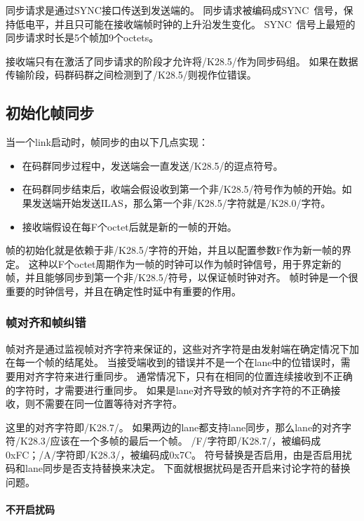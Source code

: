 \documentclass[UTF8]{ctexart}
\begin{document}
同步请求是通过SYNC接口传送到发送端的。
同步请求被编码成SYNC~信号，保持低电平，并且只可能在接收端帧时钟的上升沿发生变化。
SYNC~信号上最短的同步请求时长是5个帧加9个octets。

接收端只有在激活了同步请求的阶段才允许将/K28.5/作为同步码组。
如果在数据传输阶段，码群码群之间检测到了/K28.5/则视作位错误。

\subsection{初始化帧同步}

当一个link启动时，帧同步的由以下几点实现：

\begin{itemize}
  \item 在码群同步过程中，发送端会一直发送/K28.5/的逗点符号。
  \item 在码群同步结束后，收端会假设收到第一个非/K28.5/符号作为帧的开始。如果发送端开始发送ILAS，那么第一个非/K28.5/字符就是/K28.0/字符。
  \item 接收端假设在每F个octet后就是新的一帧的开始。
\end{itemize}

帧的初始化就是依赖于非/K28.5/字符的开始，并且以配置参数F作为新一帧的界定。
这种以F个octet周期作为一帧的时钟可以作为帧时钟信号，用于界定新的帧，并且能够同步到第一个非/K28.5/符号，以保证帧时钟对齐。
帧时钟是一个很重要的时钟信号，并且在确定性时延中有重要的作用。

\subsubsection{帧对齐和帧纠错}

帧对齐是通过监视帧对齐字符来保证的，这些对齐字符是由发射端在确定情况下加在每一个帧的结尾处。
当接受端收到的错误并不是一个在lane中的位错误时，需要用对齐字符来进行重同步。
通常情况下，只有在相同的位置连续接收到不正确的字符时，才需要进行重同步。
如果是lane对齐导致的帧对齐字符的不正确接收，则不需要在同一位置等待对齐字符。

这里的对齐字符即/K28.7/。
如果两边的lane都支持lane同步，那么lane的对齐字符/K28.3/应该在一个多帧的最后一个帧。
/F/字符即/K28.7/，被编码成0xFC；/A/字符即/K28.3/，被编码成0x7C。
符号替换是否启用，由是否启用扰码和lane同步是否支持替换来决定。
下面就根据扰码是否开启来讨论字符的替换问题。

\paragraph{不开启扰码}
\end{document}
